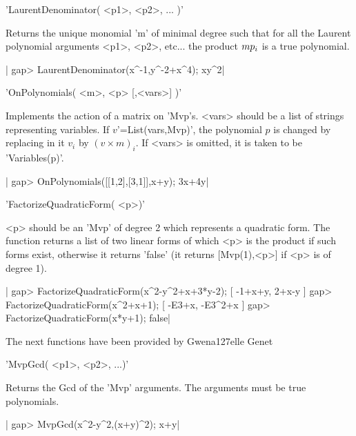 'LaurentDenominator( <p1>, <p2>, ... )'

Returns the unique monomial 'm' of minimal degree such that for all the
Laurent polynomial arguments <p1>, <p2>, etc... the product $m\* p_i$ is
a true polynomial.

|    gap> LaurentDenominator(x^-1,y^-2+x^4);
    xy^2|

%
%

'OnPolynomials( <m>, <p> [,<vars>] )'

Implements  the action of  a matrix on  'Mvp's. <vars> should  be a list of
strings representing variables. If $v$'=List(vars,Mvp)', the polynomial $p$
is  changed  by  replacing  in  it  $v_i$  by $(v\times m)_i$. If <vars> is
omitted, it is taken to be 'Variables(p)'.

|    gap> OnPolynomials([[1,2],[3,1]],x+y);    
    3x+4y|

%
%

'FactorizeQuadraticForm( <p>)'

<p>  should be an 'Mvp' of degree  2 which represents a quadratic form. The
function  returns a list of two linear forms of which <p> is the product if
such  forms exist, otherwise it returns 'false' (it returns [Mvp(1),<p>] if
<p> is of degree 1).

|    gap> FactorizeQuadraticForm(x^2-y^2+x+3*y-2);
    [ -1+x+y, 2+x-y ]
    gap> FactorizeQuadraticForm(x^2+x+1);        
    [ -E3+x, -E3^2+x ]
    gap> FactorizeQuadraticForm(x*y+1);  
    false|


The next functions have been provided by Gwena{\accent 127e}lle Genet


'MvpGcd( <p1>, <p2>, ...)'

Returns  the Gcd  of the  'Mvp' arguments.  The arguments  must be  true
polynomials.

|    gap> MvpGcd(x^2-y^2,(x+y)^2);
    x+y|


